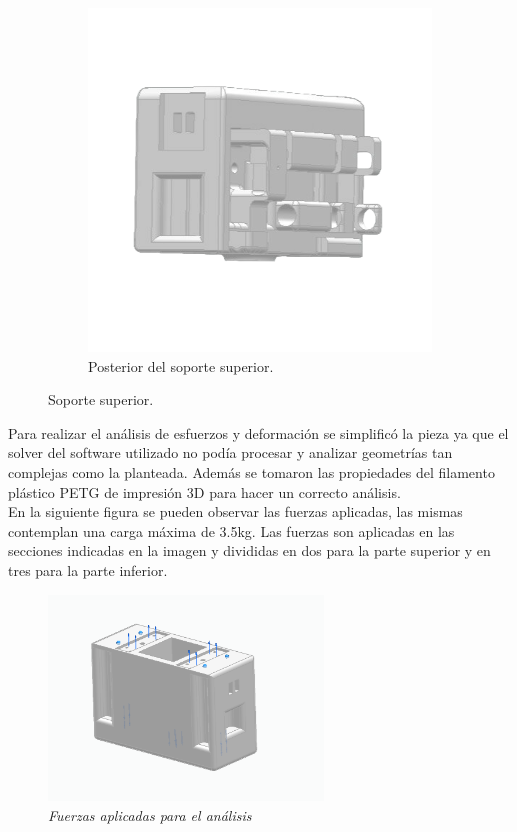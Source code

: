 \begin{figure}[H]
\begin{subfigure}[b]{0.45\textwidth}
        \includegraphics[width=\textwidth]{img/superior_atras.jpg}
        \caption{Posterior del soporte superior.}
        \label{fig:izaje_acoplado}
    \end{subfigure}
     \caption{Soporte superior.}
    \label{fig:Superior_orginal}
\end{figure}
Para realizar el análisis de esfuerzos y deformación se simplificó la pieza ya que el solver del software utilizado no podía procesar y analizar geometrías tan complejas como la planteada. Además se tomaron las propiedades del filamento plástico PETG de impresión 3D para hacer un correcto análisis.\\
En la siguiente figura se pueden observar las fuerzas aplicadas, las mismas contemplan una carga máxima de 3.5kg. Las fuerzas son aplicadas en las secciones indicadas en la imagen y divididas en dos para la parte superior y en tres para la parte inferior.\\
\begin{figure}[H]
    \centering
\includegraphics[width=0.65\textwidth]{img/Fuerzas_superiores.png} \par
    \caption{\textit{Fuerzas aplicadas para el análisis}}
    \label{fig:fuerzas_sup}
\end{figure}

